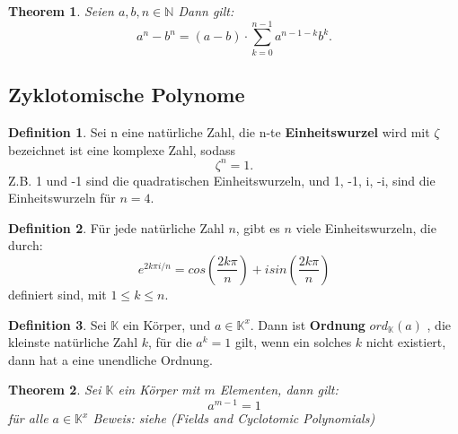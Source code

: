 \documentclass[12pt,oneside]{article}
\newtheorem{theorem}{Theorem}[section]
\theoremstyle{remark}
\theoremstyle{definition}
\newtheorem{definition}{Definition}[section]
\begin{document}
\smallskip

\begin{theorem}\label{funny_id}
Seien $a,b,n \in \mathbb{N}$ Dann gilt:\newline\newline \begin{equation}
    a^{n} - b^n = (a - b) \cdot \sum_{k = 0}^{n - 1} a^{n -1 - k} b^k.
\end{equation}
\end{theorem}


\smallskip

\subsection{Zyklotomische Polynome}

\begin{definition}
Sei n eine natürliche Zahl, die n-te \textbf{Einheitswurzel} wird mit $\zeta$ bezeichnet ist eine komplexe Zahl, sodass
\begin{equation}
    \zeta^n = 1.
\end{equation}
Z.B. 1 und -1 sind die quadratischen Einheitswurzeln, und 1, -1, i, -i, sind die Einheitswurzeln für $n = 4$.    
\end{definition}

\smallskip

\begin{definition}
Für jede natürliche Zahl $n$, gibt es $n$ viele Einheitswurzeln, die durch:\newline
\begin{equation}
    e^{2k\pi i/n} = cos(\frac{2k \pi }{n}) + i sin(\frac{2k \pi}{n})
\end{equation}
definiert sind, mit $1 \leq k \leq n$.
\end{definition}

\smallskip

\begin{definition}\label{ord_def}
Sei $\mathbb{K}$ ein Körper, und $a \in \mathbb{K}^x$. Dann ist \textbf{Ordnung} $ ord_{ \mathbb{K} }(a)$ , die kleinste natürliche Zahl $k$, für die $a^k = 1 $ gilt, wenn ein solches $k$ nicht existiert, dann hat a eine unendliche Ordnung. 
\end{definition}

\smallskip

\begin{theorem}
Sei $\mathbb{K}$ ein Körper mit $m$ Elementen, dann gilt:
\begin{equation}
    a^{m-1} = 1
\end{equation}
für alle $a \in \mathbb{K}^x$\newline
Beweis: siehe (Fields and Cyclotomic Polynomials) 
\end{theorem}
\end{document}
